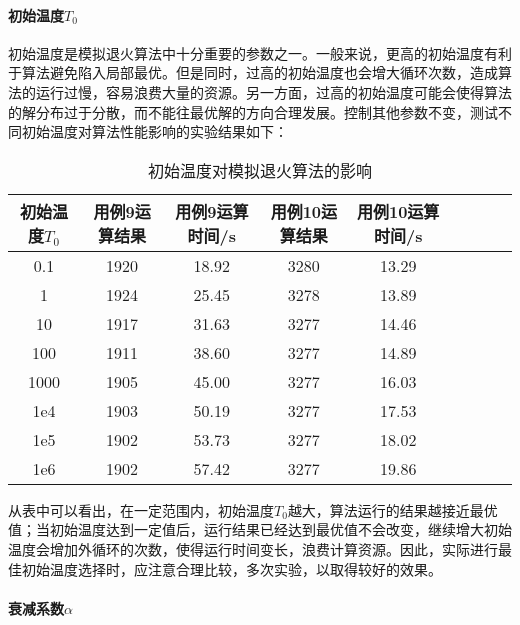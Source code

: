 \documentclass[UTF8]{ctexart}
\begin{document}
\paragraph{初始温度\(T_0\)}

初始温度是模拟退火算法中十分重要的参数之一。一般来说，更高的初始温度有利于算法避免陷入局部最优。但是同时，过高的初始温度也会增大循环次数，造成算法的运行过慢，容易浪费大量的资源。另一方面，过高的初始温度可能会使得算法的解分布过于分散，而不能往最优解的方向合理发展。控制其他参数不变，测试不同初始温度对算法性能影响的实验结果如下：

\begin{table} 
	\centering
	\caption{初始温度对模拟退火算法的影响}
	\begin{tabular}{ccccccccc} %
		
		\toprule %
初始温度\(T_0\) & 用例9运算结果 & 用例9运算时间/s & 用例10运算结果 &
用例10运算时间/s \\
		\hline %
0.1 & 1920 & 18.92 & 3280 & 13.29 \\
1 & 1924 & 25.45 & 3278 & 13.89 \\
10 & 1917 & 31.63 & 3277 & 14.46 \\
100 & 1911 & 38.60 & 3277 & 14.89 \\
1000 & 1905 & 45.00 & 3277 & 16.03 \\
1e4 & 1903 & 50.19 & 3277 & 17.53 \\
1e5 & 1902 & 53.73 & 3277 & 18.02 \\
1e6 & 1902 & 57.42 & 3277 & 19.86 \\
		\bottomrule %
	\end{tabular}
\end{table}




从表中可以看出，在一定范围内，初始温度\(T_0\)越大，算法运行的结果越接近最优值；当初始温度达到一定值后，运行结果已经达到最优值不会改变，继续增大初始温度会增加外循环的次数，使得运行时间变长，浪费计算资源。因此，实际进行最佳初始温度选择时，应注意合理比较，多次实验，以取得较好的效果。

\paragraph{衰减系数\(\alpha\)}
\end{document}
